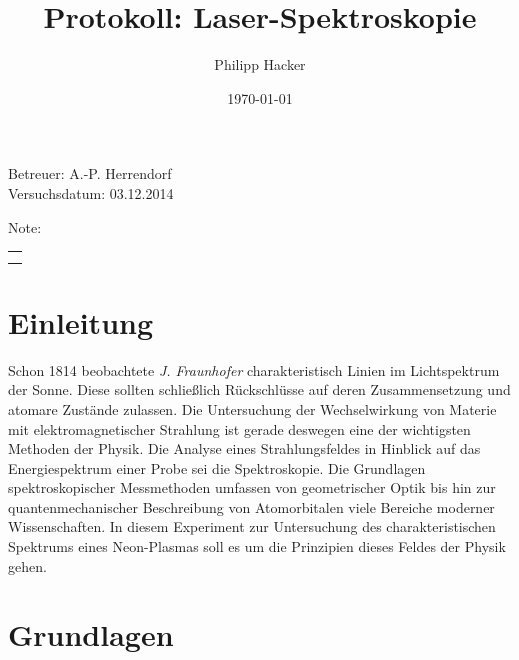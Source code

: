 \documentclass[numbers=noenddot,12pt,a4paper]{scrartcl}
\title{Protokoll: Laser-Spektroskopie} %
\author{Philipp Hacker} %
\date{\today}
\newcommand{\tilt}[1]{\textit{#1}}
\begin{document}
\maketitle
\begin{center}
Betreuer: A.-P. Herrendorf\\ %
Versuchsdatum: 03.12.2014\\ %
\begin{table}[h]
\centering
Note: %
\begin{tabularx}{1.5cm}{|X|}
\hline \\ \\
\hline
\end{tabularx}
\end{table}
\end{center}
\vspace*{\fill}
\tableofcontents
\vfill
\newpage
\section{Einleitung}
Schon 1814 beobachtete \tilt{J. Fraunhofer} charakteristisch Linien im Lichtspektrum der Sonne. Diese sollten schließlich Rückschlüsse auf deren Zusammensetzung und atomare Zustände zulassen. Die Untersuchung der Wechselwirkung von Materie mit elektromagnetischer Strahlung ist gerade deswegen eine der wichtigsten Methoden der Physik. Die Analyse eines Strahlungsfeldes in Hinblick auf das Energiespektrum einer Probe sei die Spektroskopie. Die Grundlagen spektroskopischer Messmethoden umfassen von geometrischer Optik bis hin zur quantenmechanischer Beschreibung von Atomorbitalen viele Bereiche moderner Wissenschaften. In diesem Experiment zur Untersuchung des charakteristischen Spektrums eines Neon-Plasmas soll es um die  Prinzipien dieses Feldes der Physik gehen.
\newpage
\section{Grundlagen}
\end{document}
